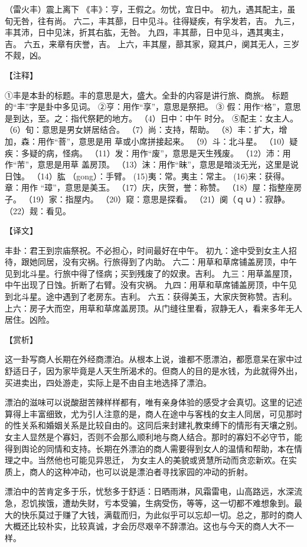 \documentclass[a4paper,12pt,UTF8,twoside]{ctexbook}
\begin{document}
（雷火丰）震上离下
《丰》：亨，王假之。勿忧，宜日中。
初九，遇其配主，虽旬无咎，往有尚。
六二，丰其蔀，日中见斗。往得疑疾，有孚发若，吉。
九三，丰其沛，日中见沫，折其右肱，无咎。
九四，丰其蔀，日中见斗，遇其夷主，吉。
六五，来章有庆誉，吉。
上六，丰其屋，蔀其家，窥其户，阒其无人，三岁不觌，凶。

【注释】

①丰是本卦的标题。丰的意思是大，盛大。全卦的内容是讲行旅、商旅。 标题的“丰”字是卦中多见词。
②亨：用作“享”，意思是祭把。
③ 假：用作“格”，意思是到达，至。之：指代祭耙的地方。
（4）日中：中午 时分。
⑤配主：女主人。
（6）旬：意思是男女姘居结合。
（7）尚：支持，帮助。
（8）丰：扩大，增加，森：用作“菩”，意思是用 草或小席拼接起来。
（9）斗：北斗星。
（10）疑疾：多疑的病，怪病。
（11）发：用作“废”，意思是天生残废。
（12）沛：用作“芾”，意思是用草 盖房顶。
（13）沫：用作“昧”，意思是暗淡无光，这里是说日蚀。
（14）肱 （gong）：手臂。
(15)夷：常。夷主：常主。
(16)来：获得。章：用作 “璋”，意思是美玉。
（17）庆，庆贺，誉：称赞。
（18）屋：指整座房子。
（19）家：指屋内。
（20）窥：意思是探看。
（21）阒（ｑｕ）：寂静。
（22）觌：看见。

【译文】

丰卦：君王到宗庙祭祝。不必担心，时间最好在中午。
初九：途中受到女主人招待，跟她同居，没有灾祸。行旅得到了内助。
六二：用草和草席铺盖房顶，中午见到北斗星。行旅中得了怪病；买到残废了的奴隶。吉利。
九三：用草盖屋顶，中午出现了日蚀。折断了右臂。没有灾祸。
九四：用草和草席铺盖房顶，中午见到北斗星。途中遇到了老房东。吉利。
六五：获得美玉，大家庆贺称赞。吉利。
上六：房子大而空，用草和草席盖房顶。从门缝往里看，寂静无人，看来多年无人居住。凶险。

【赏析】

这一卦写商人长期在外经商漂泊。从根本上说，谁都不愿漂泊，都愿意呆在家中过舒适日子，因为家毕竟是人天生所渴术的。但商人的目的是水钱，为此就得外出，买进卖出，四处游走，实际上是不由自主地选择了漂泊。

漂泊的滋味可以说酸甜苦辣样样都有，唯有亲身体验的感受才会真切。这里的记述算得上丰富细致，尤为引人注意的是，商人在途中与客栈的女主人同居，可见那时的性关系和婚姻关系是比较自由的。这同后来封建礼教束缚下的情形有天壤之别。女主人显然是个寡妇，否则不会那么顺利地与商人结合。那时的寡妇不必守节，能得到舆论的同情和支持。长期在外漂泊的商人需要得到女人的温情和帮助，本在情理之中。当然他也可能见异思迁， 为女主人的美貌或贤慧所动而贪恋新欢。在实质上，商人的这种冲动，也可以说是漂泊者寻找家园的冲动的折射。

漂泊中的苦肯定多于乐，忧愁多于舒适：日晒雨淋，风霜雷电，山高路远，水深流急，忍饥挨饿，遭劫失财，亏本受骗，生病受伤，等等，这一切都不难想象到。最大的快乐莫过于赚了大钱，满载而归，为此似乎可以忘却一切。总之，那时的商人大概还比较朴实，比较真诚，才会历尽艰辛不辞漂泊。这也与今天的商人大不一样。
\end{document}
